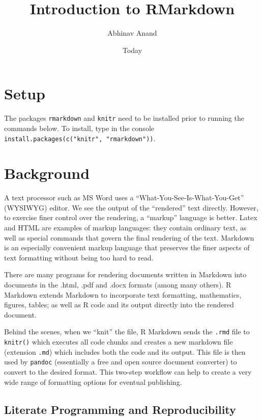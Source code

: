 \documentclass[11pt,]{article}
\title{Introduction to RMarkdown}
\author{Abhinav Anand}
\date{Today}
\begin{document}
\maketitle

\section{Setup}\label{setup}

The packages \texttt{rmarkdown} and \texttt{knitr} need to be installed
prior to running the commands below. To install, type in the console
\texttt{install.packages(c("knitr",\ "rmarkdown"))}.

\section{Background}\label{background}

A text processor such as MS Word uses a ``What-You-See-Is-What-You-Get''
(WYSIWYG) editor. We see the output of the ``rendered'' text directly.
However, to exercise finer control over the rendering, a ``markup''
language is better. Latex and HTML are examples of markup languages:
they contain ordinary text, as well as special commands that govern the
final rendering of the text. Markdown is an especially convenient markup
language that preserves the finer aspects of text formatting without
being too hard to read.

There are many programs for rendering documents written in Markdown into
documents in the .html, .pdf and .docx formats (among many others). R
Markdown extends Markdown to incorporate text formatting, mathematics,
figures, tables; as well as R code and its output directly into the
rendered document.

Behind the scenes, when we ``knit'' the file, R Markdown sends the
\texttt{.rmd} file to \texttt{knitr()} which executes all code chunks
and creates a new markdown file (extension \texttt{.md}) which includes
both the code and its output. This file is then used by \texttt{pandoc}
(essentially a free and open source document converter) to convert to
the desired format. This two-step workflow can help to create a very
wide range of formatting options for eventual publishing.

\subsection{Literate Programming and
Reproducibility}\label{literate-programming-and-reproducibility}
\end{document}
